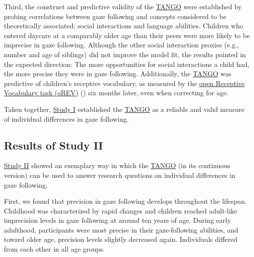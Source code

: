 \documentclass[
]{scrbook}
\begin{document}
Third, the construct and predictive validity of the \hyperref[acronyms_TANGO]{TANGO} were established by probing correlations between gaze following and concepts considered to be theoretically associated: social interactions and language abilities. Children who entered daycare at a comparably older age than their peers were more likely to be imprecise in gaze following. Although the other social interaction proxies (e.g., number and age of siblings) did not improve the model fit, the results pointed in the expected direction: The more opportunities for social interactions a child had, the more precise they were in gaze following. Additionally, the \hyperref[acronyms_TANGO]{TANGO} was predictive of children's receptive vocabulary, as measured by the \hyperref[acronyms_oREV]{open Receptive Vocabulary task (oREV)} () six months later, even when correcting for age.

Taken together, \hyperref[studyI]{Study I} established the \hyperref[acronyms_TANGO]{TANGO} as a reliable and valid measure of individual differences in gaze following.

\subsection{Results of Study II}\label{results-studyII}

\hyperref[studyII]{Study II} showed an exemplary way in which the \hyperref[acronyms_TANGO]{TANGO} (in its continuous version) can be used to answer research questions on individual differences in gaze following.

First, we found that precision in gaze following develops throughout the lifespan. Childhood was characterized by rapid changes and children reached adult-like imprecision levels in gaze following at around ten years of age. During early adulthood, participants were most precise in their gaze-following abilities, and toward older age, precision levels slightly decreased again. Individuals differed from each other in all age groups.
\end{document}
